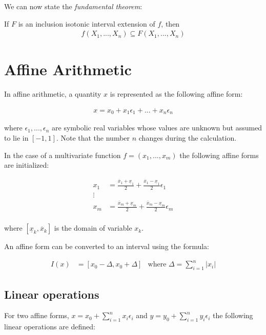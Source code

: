 \documentclass[fontsize=11pt,a4paper]{scrartcl} %
\begin{document}
We can now state the \emph{fundamental theorem}:

If $F$ is an inclusion isotonic interval extension of $f$, then
\begin{align}
    f(X_1, ..., X_n) \subseteq F(X_1, ..., X_n)
\end{align}

\section{Affine Arithmetic}

In affine arithmetic, a quantity $x$ is represented as the following affine form:

\begin{align}
    x = x_0 + x_1 \epsilon_1 + ... + x_n \epsilon_n
\end{align}

where $\epsilon_1, ..., \epsilon_n$ are symbolic real variables whose values are unknown but assumed to lie in $[-1, 1]$. Note that the number $n$ changes during the calculation.

In the case of a multivariate function $f=(x_1,...,x_m)$ the following affine forms are initialized:

\begin{align}
    x_1 &= \frac{\overline{x}_1 + \underline{x}_1}{2} +  \frac{\overline{x}_1 - \underline{x}_1}{2} \epsilon_1\\
    \vdots\\
    x_m &= \frac{\overline{x}_m + \underline{x}_m}{2} +  \frac{\overline{x}_m - \underline{x}_m}{2} \epsilon_m\\
\end{align}

where $[\underline{x}_k, \overline{x}_k]$ is the domain of variable $x_k$.

An affine form can be converted to an interval using the formula:

\begin{align}
    I(x) &= [x_0 - \Delta, x_0 + \Delta] & \text{where } \Delta = \sum_{i=1}^n |x_i|
\end{align}


\subsection{Linear operations}

For two affine forms, $x = x_0 + \sum_{i=1}^n x_i \epsilon_i$ and $y = y_0 + \sum_{i=1}^n y_i \epsilon_i$ the following linear operations are defined:
\end{document}

